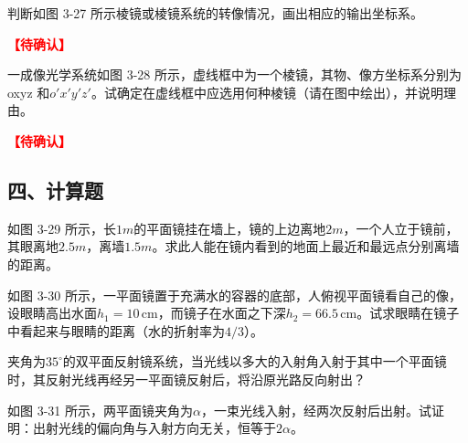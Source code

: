 \documentclass[standard, analysis, notocnum]{ExBook}
\newcommand{\answerarea}[1][8cm]{%
  \par\vspace{2mm}%
  \noindent{\color{themeColor!35}\rule{\linewidth}{0.4pt}}\par
  \noindent\begin{minipage}[t][#1][t]{\linewidth}\vspace{0pt}\end{minipage}\par
  \noindent{\color{themeColor!35}\rule{\linewidth}{0.4pt}}\par
}
\newcommand{\tbd}{\textcolor{red}{\textbf{【待确认】}}}
\begin{document}
\begin{qitems}[startnum=2]
\qitem 判断如图 3-27 所示棱镜或棱镜系统的转像情况，画出相应的输出坐标系。
\par\noindent\tbd
{}
\label{q:59:start}
\answerarea[8cm]
\label{q:59:end}
\end{qitems}

\begin{qitems}[startnum=3,suffix={*}]
\qitem[][.] 一成像光学系统如图 3-28 所示，虚线框中为一个棱镜，其物、像方坐标系分别为 oxyz 和$o'x'y'z'$。试确定在虚线框中应选用何种棱镜（请在图中绘出），并说明理由。
\par\noindent\tbd
{}
\label{q:60:start}
\answerarea[8cm]
\label{q:60:end}
\end{qitems}

\subsection{四、计算题}
\begin{qitems}[startnum=1]
\qitem 如图 3-29 所示，长$1m$的平面镜挂在墙上，镜的上边离地$2m$，一个人立于镜前，其眼离地$2.5m$，离墙$1.5m$。求此人能在镜内看到的地面上最近和最远点分别离墙的距离。
\label{q:62:start}
\answerarea[8cm]
\label{q:62:end}
\end{qitems}

\begin{qitems}[startnum=2]
\qitem 如图 3-30 所示，一平面镜置于充满水的容器的底部，人俯视平面镜看自己的像，设眼睛高出水面$h_{1}=10\,\mathrm{cm}$，而镜子在水面之下深$h_{2}=66.5\,\mathrm{cm}$。试求眼睛在镜子中看起来与眼睛的距离（水的折射率为$4/3$）。
\label{q:63:start}
\answerarea[8cm]
\label{q:63:end}
\end{qitems}

\begin{qitems}[startnum=3]
\qitem 夹角为$35^{\circ}$的双平面反射镜系统，当光线以多大的入射角入射于其中一个平面镜时，其反射光线再经另一平面镜反射后，将沿原光路反向射出？
\label{q:64:start}
\answerarea[8cm]
\label{q:64:end}
\end{qitems}

\begin{qitems}[startnum=4]
\qitem 如图 3-31 所示，两平面镜夹角为$\alpha$，一束光线入射，经两次反射后出射。试证明：出射光线的偏向角与入射方向无关，恒等于$2\alpha$。
\label{q:65:start}
\answerarea[8cm]
\label{q:65:end}
\end{qitems}
\end{document}
